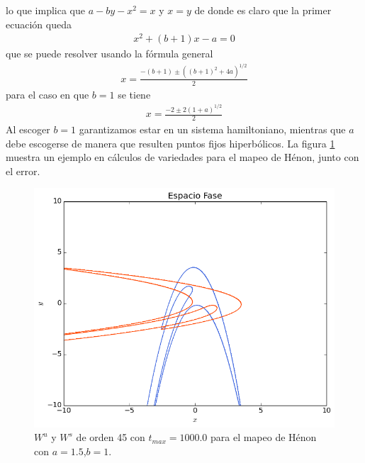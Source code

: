 lo que implica que $a-by-x^{2}=x$ y $x=y$ de donde es claro que la primer ecuación queda
\begin{eqnarray*}
x^{2}+(b+1)x-a=0
\end{eqnarray*}
que se puede resolver usando la fórmula general
\begin{eqnarray*}
x=\frac{-(b+1)\pm ((b+1)^{2}+4a)^{1/2} }{2}
\end{eqnarray*}
para el caso en que $b=1$ se tiene
\begin{eqnarray}
x=\frac{-2\pm 2(1+a)^{1/2} }{2}
\end{eqnarray}
Al escoger $b=1$ garantizamos estar en un sistema hamiltoniano, mientras que $a$ debe escogerse de manera que resulten puntos fijos hiperbólicos. La figura \ref{Henon1} muestra un ejemplo en cálculos de variedades para el mapeo de Hénon, junto con el error. 
\begin{figure}[H]
\centering
\includegraphics[scale=0.6]{henon1}
\caption{$W^{u}$ y $W^{s}$ de orden 45 con $t_{max}=1000.0$ para el mapeo de Hénon con $a=1.5$,$b=1$.}
\label{Henon1}
\end{figure}

